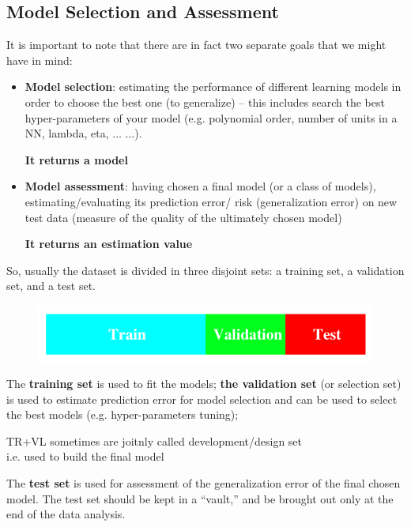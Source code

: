 \documentclass[../main.tex]{subfiles}
\begin{document}
\subsection{Model Selection and Assessment}
It is important to note that there are in fact two separate goals that we might have in mind:
\begin{itemize}
    \item \textbf{Model selection}: estimating the performance of
different learning models in order to choose the best one (to generalize)
– this includes search the best hyper-parameters of your model (e.g. polynomial order, number of units in a NN, lambda, eta, ... ...).
\begin{center}
    \textbf{It returns a model}
\end{center}
\item \textbf{Model assessment}: having chosen a final model (or a class of models), estimating/evaluating its prediction error/ risk (generalization error) on new test data (measure of the quality of the ultimately chosen model)
\begin{center}
    \textbf{It returns an estimation value}
\end{center}
\end{itemize}
So, usually the dataset is divided in three disjoint sets: a training set, a validation set, and a test set.
\begin{figure}[H]
    \centering
    \includegraphics[scale  =0.4]{lectures/5_validation/5_data_partition_for_validation.png}
\end{figure}
The \textbf{training set} is used to fit the models; \textbf{the validation set} (or selection set) is used to estimate prediction error for model selection and can be used to select the best models (e.g. hyper-parameters tuning); 
\begin{center}
    TR+VL sometimes are joitnly called development/design set\\ i.e. used to build the final model
\end{center}
The \textbf{test set} is used for assessment of the generalization error of the final chosen model. The test set should be kept in a “vault,” and be brought out only at the end of the data analysis.\\
\end{document}

